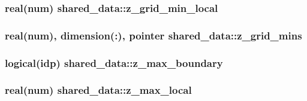 \subsubsection[{\texorpdfstring{z\+\_\+grid\+\_\+min\+\_\+local}{z_grid_min_local}}]{\setlength{\rightskip}{0pt plus 5cm}real(num) shared\+\_\+data\+::z\+\_\+grid\+\_\+min\+\_\+local}\hypertarget{namespaceshared__data_a09f7e7f94540648ce5317cf34331f893}{}\label{namespaceshared__data_a09f7e7f94540648ce5317cf34331f893}
\subsubsection[{\texorpdfstring{z\+\_\+grid\+\_\+mins}{z_grid_mins}}]{\setlength{\rightskip}{0pt plus 5cm}real(num), dimension(\+:), pointer shared\+\_\+data\+::z\+\_\+grid\+\_\+mins}\hypertarget{namespaceshared__data_a7888fecc3fc8288475a70c8cec55313e}{}\label{namespaceshared__data_a7888fecc3fc8288475a70c8cec55313e}
\subsubsection[{\texorpdfstring{z\+\_\+max\+\_\+boundary}{z_max_boundary}}]{\setlength{\rightskip}{0pt plus 5cm}logical(idp) shared\+\_\+data\+::z\+\_\+max\+\_\+boundary}\hypertarget{namespaceshared__data_ac180e0f2fae72319d7a6be1f1bbf4bb3}{}\label{namespaceshared__data_ac180e0f2fae72319d7a6be1f1bbf4bb3}
\subsubsection[{\texorpdfstring{z\+\_\+max\+\_\+local}{z_max_local}}]{\setlength{\rightskip}{0pt plus 5cm}real(num) shared\+\_\+data\+::z\+\_\+max\+\_\+local}\hypertarget{namespaceshared__data_a7931e0059b790ccef3cc00c59d806c7c}{}\label{namespaceshared__data_a7931e0059b790ccef3cc00c59d806c7c}
